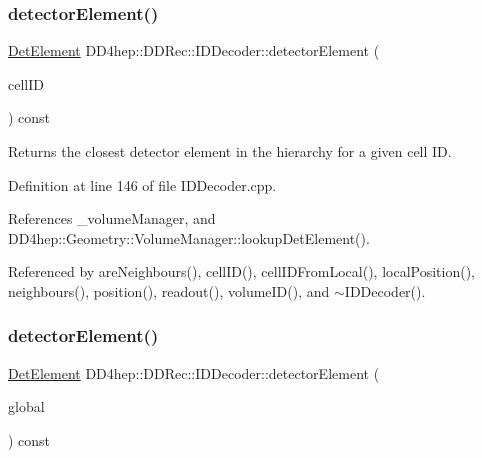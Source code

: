 \subsubsection{\texorpdfstring{detector\+Element()}{detectorElement()}\hspace{0.1cm}{\footnotesize\ttfamily [1/2]}}
{\footnotesize\ttfamily \hyperlink{class_d_d4hep_1_1_geometry_1_1_det_element}{Det\+Element} D\+D4hep\+::\+D\+D\+Rec\+::\+I\+D\+Decoder\+::detector\+Element (\begin{DoxyParamCaption}\item[{const \hyperlink{namespace_d_d4hep_1_1_d_d_rec_af5cecc2e566eeaedb430b92df23971d4}{Cell\+ID} \&}]{cell\+ID }\end{DoxyParamCaption}) const}



Returns the closest detector element in the hierarchy for a given cell ID. 



Definition at line 146 of file I\+D\+Decoder.\+cpp.



References \+\_\+volume\+Manager, and D\+D4hep\+::\+Geometry\+::\+Volume\+Manager\+::lookup\+Det\+Element().



Referenced by are\+Neighbours(), cell\+I\+D(), cell\+I\+D\+From\+Local(), local\+Position(), neighbours(), position(), readout(), volume\+I\+D(), and $\sim$\+I\+D\+Decoder().

\hypertarget{class_d_d4hep_1_1_d_d_rec_1_1_i_d_decoder_a42116917002ef466e286233fef6ca84a}{}\label{class_d_d4hep_1_1_d_d_rec_1_1_i_d_decoder_a42116917002ef466e286233fef6ca84a} 
\subsubsection{\texorpdfstring{detector\+Element()}{detectorElement()}\hspace{0.1cm}{\footnotesize\ttfamily [2/2]}}
{\footnotesize\ttfamily \hyperlink{class_d_d4hep_1_1_geometry_1_1_det_element}{Det\+Element} D\+D4hep\+::\+D\+D\+Rec\+::\+I\+D\+Decoder\+::detector\+Element (\begin{DoxyParamCaption}\item[{const \hyperlink{namespace_d_d4hep_1_1_geometry_a55083902099d03506c6db01b80404900}{Geometry\+::\+Position} \&}]{global }\end{DoxyParamCaption}) const}



